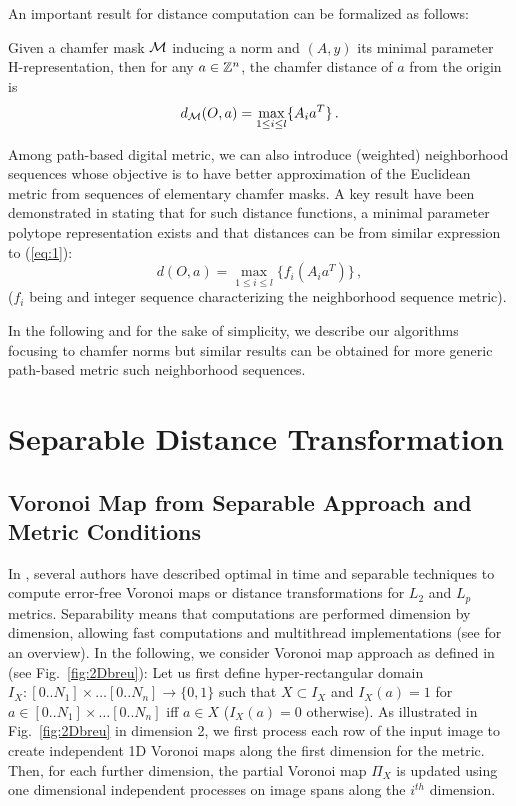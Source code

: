\documentclass{llncs}
\begin{document}
An important result for distance computation can be formalized as follows:
\begin{proposition}
  Given a chamfer mask $\mathcal{M}$ inducing a norm and $(A,y)$ its minimal
  parameter H-representation, then for any $a\in{\mathbb{Z}}^n$, the chamfer
  distance of $a$ from the origin is
  \begin{equation}
    \label{eq:1}
    d_{\mathcal{M}}(O,a) =  \max_{1\leq i \leq l} \{ A_i a^T\}\,.
  \end{equation}
\end{proposition}


Among path-based digital metric, we can also introduce (weighted)
neighborhood sequences
\cite{ROSEN_66,mukherjee,Nagy05,Strand2008,DBLP:conf/dgci/NormandSE13}
whose objective is to have better approximation of the Euclidean
metric from sequences of elementary chamfer masks.  A key result have
been demonstrated in \cite{DBLP:journals/pr/NormandE09} stating
that for such distance functions, a minimal parameter polytope
representation exists and that distances can be from similar
expression to (\ref{eq:1}):
\begin{equation}
  d(O,a)  =\max_{1\leq i \leq l} \{ f_i(A_i a^T)\}\,,
\end{equation}
($f_i$ being and integer sequence characterizing the neighborhood
sequence metric).

 In the following and for the sake of simplicity, we describe our
 algorithms focusing to chamfer norms but similar results can be
 obtained for more generic path-based metric such neighborhood
 sequences.
\section{Separable Distance Transformation}
\label{sec:separ-dist-transf}
\subsection{Voronoi Map from Separable Approach and Metric Conditions}
\label{sec:voronoi-map-from}
In \cite{Hirata1996,SaitTori:94,Breu1995,Meijster2000,Maurer2003},
several authors have described optimal in time and separable
techniques to compute error-free Voronoi maps or distance
transformations for $L_2$ and $L_p$ metrics. Separability means that
computations are performed dimension by dimension, allowing fast
computations and multithread implementations (see
\cite{dcoeurjo_ChapDT} for an overview).  In the following, we
consider Voronoi map approach as defined in \cite{Breu1995} (see
Fig.~\ref{fig:2Dbreu}): Let us first define hyper-rectangular domain
$I_X: [0..N_1]\times\ldots[0..N_n] \rightarrow \{0,1\}$ such that
$X\subset I_X$ and $I_X(a)= 1$ for $a\in [0..N_1]\times\ldots[0..N_n]$
iff $a\in X$ ($I_X(a)=0$ otherwise). As illustrated in
Fig.~\ref{fig:2Dbreu} in dimension 2, we first process each row of the
input image to create independent 1D Voronoi maps along the first
dimension for the metric. Then, for each further dimension, the
partial Voronoi map $\Pi_X$ is updated using one dimensional
independent processes on image spans along the $i^{th}$
dimension.
\end{document}
